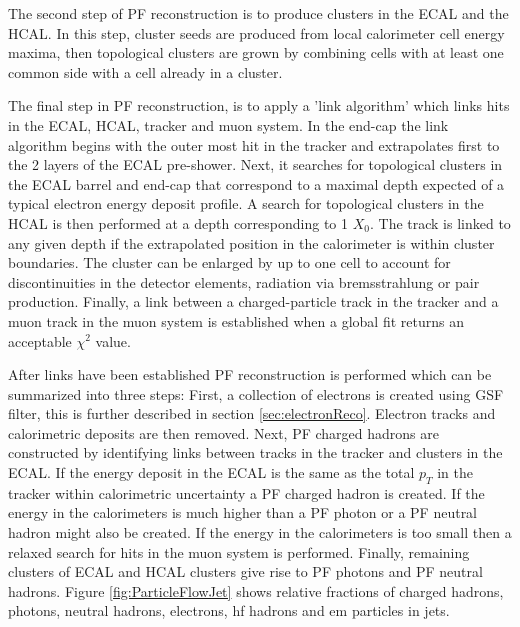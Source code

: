 The second step of PF reconstruction is to produce clusters in the ECAL and the HCAL. 
In this step, cluster seeds are produced from local calorimeter cell energy maxima, 
then topological clusters are grown by combining cells with at least one common side
with a cell already in a cluster. 

The final step in PF reconstruction, is to apply a 'link algorithm' which links
hits in the ECAL, HCAL, tracker and muon system. In the end-cap the link algorithm
begins with the outer most hit in the tracker and extrapolates
first to the 2 layers of the ECAL pre-shower. Next, it searches for topological clusters
in the ECAL barrel and end-cap that correspond to a maximal depth expected of a typical
electron energy deposit profile. A search for topological clusters in the
HCAL is then performed at a depth corresponding to 1 $X_{0}$.
The track is linked to any given depth if the extrapolated position in 
the calorimeter is within cluster boundaries. The cluster can be enlarged by up 
to one cell to account for discontinuities in the detector elements, radiation via
bremsstrahlung or pair production. Finally, a link between a charged-particle
track in the tracker and a muon track in the muon system is established
when a global fit returns an acceptable $\chi^{2}$ value.

After links have been established PF reconstruction is performed which
can be summarized into three steps: First, a collection of electrons is created using GSF filter,
this is further described in section \ref{sec:electronReco}. Electron
 tracks and calorimetric deposits are then removed. Next, 
PF charged hadrons are constructed by identifying links between tracks in the 
tracker and clusters in the ECAL. If the energy deposit in the ECAL is 
the same as the total $p_{T}$ in the tracker within calorimetric uncertainty a 
PF charged hadron is created. If the energy in the calorimeters is much higher
than a PF photon or a PF neutral hadron might also be created. If the energy in 
the calorimeters is too small then a relaxed search for hits in the muon system
is performed. Finally, remaining clusters of ECAL and HCAL clusters give rise
to PF photons and PF neutral hadrons. Figure \ref{fig:ParticleFlowJet} %
shows relative fractions of charged hadrons, photons, neutral hadrons, electrons,
hf hadrons and em particles in jets.

